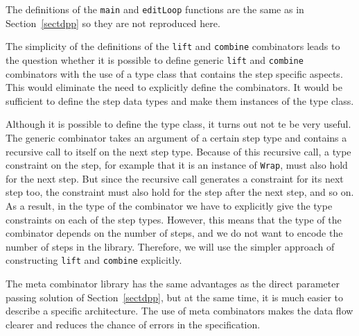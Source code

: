\par The definitions of the \texttt{main} and \texttt{editLoop} functions
        are the same as in Section~\ref{sectdpp} so they are not reproduced
        here.
\par  {}
\par The simplicity of the definitions of the \texttt{lift} and
        \texttt{combine} combinators leads to the question whether it is possible to
        define generic \texttt{lift} and \texttt{combine} combinators with the use of a
        type class that contains the step specific aspects. This would eliminate the
        need to explicitly define the combinators. It would be sufficient to define the
        step data types and make them instances of the type class. 
\par Although it is possible to define the type class, it turns out not te
        be very useful. The generic combinator takes an argument of a certain step type
        and contains a recursive call to itself on the next step type. Because of this
        recursive call, a type constraint on the step, for example that it is an
        instance of \texttt{Wrap}, must also hold for the next step. But since the
        recursive call generates a constraint for its next step too, the constraint
        must also hold for the step after the next step, and so on. As a result, in the
        type of the combinator we have to explicitly give the type constraints on each
        of the step types. However, this means that the type of the combinator depends
        on the number of steps, and we do not want to encode the number of steps in the
        library. Therefore, we will use the simpler approach of constructing
        \texttt{lift} and \texttt{combine} explicitly.
\par The meta combinator library has the same advantages as the direct
        parameter passing solution of Section~\ref{sectdpp}, but at the same
        time, it is much easier to describe a specific architecture. The use of meta
        combinators makes the data flow clearer and reduces the chance of errors in the
        specification.
